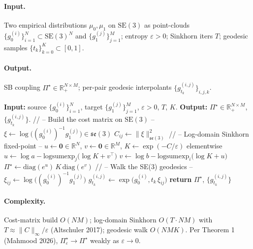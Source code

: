 \paragraph{Input.}
Two empirical distributions $\mu_{0}, \mu_{1}$ on $\mathrm{SE}(3)$
as point-clouds $\{g_{0}^{(i)}\}_{i=1}^{N} \subset \mathrm{SE}(3)^{N}$
and $\{g_{1}^{(j)}\}_{j=1}^{M}$; entropy $\varepsilon > 0$;
Sinkhorn iters $T$; geodesic samples
$\{t_{k}\}_{k=0}^{K} \subset [0, 1]$.

\paragraph{Output.}
SB coupling $\Pi^{\star} \in \mathbb{R}^{N \times M}_{+}$; per-pair
geodesic interpolants $\{g^{(i,j)}_{t_{k}}\}_{i, j, k}$.

\begin{algorithmic}[1]
  \STATE \textbf{Input:} source $\{g_{0}^{(i)}\}_{i=1}^{N}$, target
         $\{g_{1}^{(j)}\}_{j=1}^{M}$, $\varepsilon > 0$, $T$, $K$.
  \STATE \textbf{Output:} $\Pi^{\star} \in \mathbb{R}^{N \times M}_{+}$,
         $\{g^{(i,j)}_{t_{k}}\}$.
  \STATE // -- Build the cost matrix on $\mathrm{SE}(3)$ --
      \STATE $\xi \gets \log\!\bigl( (g_{0}^{(i)})^{-1} g_{1}^{(j)} \bigr) \in \mathfrak{se}(3)$
      \STATE $C_{ij} \gets \| \xi \|_{\mathfrak{se}(3)}^{2}$
    \ENDFOR
  \ENDFOR
  \STATE // -- Log-domain Sinkhorn fixed-point --
  \STATE $u \gets \mathbf{0} \in \mathbb{R}^{N}$,
         $v \gets \mathbf{0} \in \mathbb{R}^{M}$,
         $K \gets \exp(-C / \varepsilon)$ elementwise
    \STATE $u \gets \log a - \mathrm{logsumexp}_{j}
                  \!\bigl( \log K + v^{\top} \bigr)$
    \STATE $v \gets \log b - \mathrm{logsumexp}_{i}
                  \!\bigl( \log K + u \bigr)$
  \ENDFOR
  \STATE $\Pi^{\star} \gets \mathrm{diag}(e^{u}) \, K \, \mathrm{diag}(e^{v})$
  \STATE // -- Walk the SE(3) geodesics --
    \STATE $\xi_{ij} \gets \log\!\bigl( (g_{0}^{(i)})^{-1} g_{1}^{(j)} \bigr)$
      \STATE $g^{(i,j)}_{t_{k}} \gets \exp\!\bigl( g_{0}^{(i)}, t_{k}\, \xi_{ij} \bigr)$
    \ENDFOR
  \ENDFOR
  \STATE \textbf{return} $\Pi^{\star}$, $\{g^{(i,j)}_{t_{k}}\}$
\end{algorithmic}

\paragraph{Complexity.}
Cost-matrix build $O(NM)$; log-domain Sinkhorn $O(T \cdot NM)$
with $T \approx \|C\|_{\infty} / \varepsilon$ (Altschuler 2017);
geodesic walk $O(NMK)$.  Per Theorem 1 (Mahmood 2026),
$\Pi^{\star}_{\varepsilon} \to \Pi^{\star}$ weakly as
$\varepsilon \to 0$.

